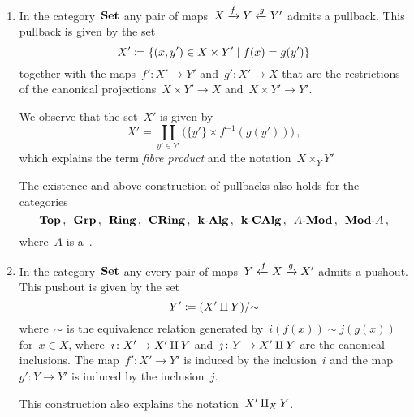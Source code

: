 \begin{example*}
  \leavevmode
  \begin{enumerate}
    \item
      In the category~$\mathbf{Set}$ any pair of maps~$X \xrightarrow{f} Y \xleftarrow{g} Y'$ admits a pullback.
      This pullback is given by the set
      \[
                  X'
        \defined  \{
                    (x,y') \in X \times Y'
                  \suchthat
                    f(x) = g(y')
                  \}
      \]
      together with the maps~$f' \colon X' \to Y'$ and~$g' \colon X' \to X$ that are the restrictions of the canonical projections~$X \times Y' \to X$ and~$X \times Y' \to Y'$.
      
      We observe that the set~$X'$ is given by
      \[
          X'
        = \coprod_{y' \in Y'} \bigl( \{ y' \} \times f^{-1}(g(y')) \bigr)  \,,
      \]
      which explains the term \emph{fibre product} and the notation~$X \times_Y Y'$
      
      The existence and above construction of pullbacks also holds for the categories
      \[
        \mathbf{Top} \,,
        \enskip
        \mathbf{Grp} \,,
        \enskip
        \mathbf{Ring} \,,
        \enskip
        \mathbf{CRing} \,,
        \enskip
        \text{$\mathbf{k}$-$\mathbf{Alg}$} \,,
        \enskip
        \text{$\mathbf{k}$-$\mathbf{CAlg}$} \,,
        \enskip
        \text{$A$-$\mathbf{Mod}$} \,,
        \enskip
        \text{$\mathbf{Mod}$-$A$} \,,
      \]
      where~$A$ is a~{\kalg}.
    \item
      In the category~$\mathbf{Set}$ any every pair of maps~$Y \xleftarrow{f} X \xrightarrow{g} X'$ admits a pushout.
      This pushout is given by the set
      \[
                  Y'
        \coloneqq  (X' \amalg Y) / {\sim}
      \]
      where~$\sim$ is the equivalence relation generated by~$i(f(x)) \sim j(g(x))$ for~$x \in X$, where~$i \colon X' \to X' \amalg Y$ and~$j \colon Y \to X' \amalg Y$ are the canonical inclusions.
      The map~$f' \colon X' \to Y'$ is induced by the inclusion~$i$ and the map~$g' \colon Y \to Y'$ is induced by the inclusion~$j$.
      
      This construction also explains the notation~$X' \amalg_X Y$.
  \end{enumerate}
\end{example*}


